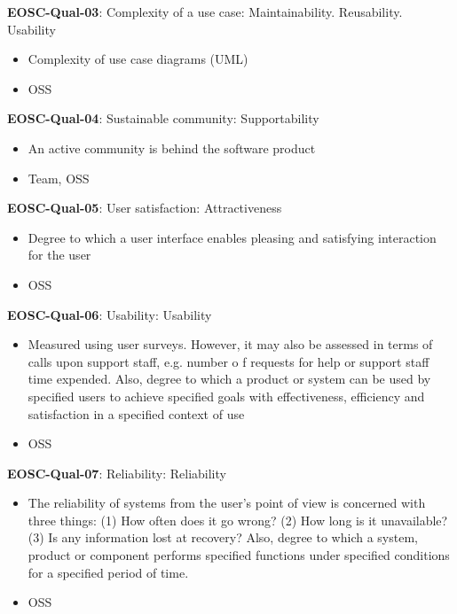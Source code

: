 \textbf{EOSC-Qual-03}: Complexity of a use case: Maintainability. Reusability. Usability

\begin{itemize}
    \item Complexity of use case diagrams (UML) \cite{montagud_systematic_2012}
    \item OSS
\end{itemize}

\textbf{EOSC-Qual-04}: Sustainable community: Supportability

\begin{itemize}
    \item An active community is behind the software product \cite{aberdour_achieving_2007}
    \item Team, OSS
\end{itemize}

\textbf{EOSC-Qual-05}: User satisfaction: Attractiveness

\begin{itemize}
    \item Degree to which a user interface enables pleasing and satisfying interaction for the user \cite{iso_25010_2011_2017,zuser_software_2005}
    \item OSS
\end{itemize}

\textbf{EOSC-Qual-06}: Usability: Usability

\begin{itemize}
    \item Measured using user surveys. However, it may also be assessed in terms of calls upon support staff, e.g. number o f requests for help or support staff time expended. Also, degree to which a product or system can be used by specified users to achieve specified goals with
effectiveness, efficiency and satisfaction in a specified context of use \cite{iso_25010_2011_2017,zuser_software_2005,gillies_modelling_1992,boehm_quantitative_1976}
    \item OSS
\end{itemize}

\textbf{EOSC-Qual-07}: Reliability: Reliability

\begin{itemize}
    \item The reliability of systems from the user's point of view is concerned with three things: (1) How often does it go wrong? (2) How long is it unavailable? (3) Is any information lost at recovery? Also, degree to which a system, product or component performs specified functions under specified conditions for a
specified period of time. \cite{iso_25010_2011_2017,gillies_modelling_1992,boehm_quantitative_1976}
    \item OSS
\end{itemize}

